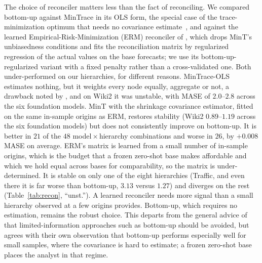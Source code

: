 \documentclass[review,number]{elsarticle}
\begin{document}
The choice of reconciler matters less than the fact of reconciling. We compared
bottom-up against MinTrace in its OLS form, the special case of the trace-minimization
optimum that needs no covariance estimate~\citep{mint2019}, and against the learned
Empirical-Risk-Minimization (ERM) reconciler of \citet{bentaieb2019erm}, which drops
MinT's unbiasedness conditions and fits the reconciliation matrix by regularized
regression of the actual values on the base forecasts; we use its
bottom-up-regularized variant with a fixed penalty rather than a cross-validated one.
Both under-performed on our hierarchies, for different reasons. MinTrace-OLS estimates
nothing, but it weights every node equally, aggregate or not, a drawback noted by
\citet{hfreview2024}, and on Wiki2 it was unstable, with MASE of $2.0$--$2.8$ across the
six foundation models. MinT
with the shrinkage covariance estimator,
fitted on the same in-sample origins as ERM, restores stability (Wiki2 $0.89$--$1.19$
across the six foundation models) but does not consistently improve on bottom-up. It is
better in $21$ of the $48$ model\,$\times$\,hierarchy combinations and worse in $26$, by
$+0.008$ MASE on average. ERM's matrix is learned from a small number of in-sample
origins, which is the budget that a frozen zero-shot base makes affordable and which we
hold equal across bases for comparability, so the matrix is under-determined. It is
stable on only one
of the eight hierarchies
(Traffic, and even there it is far worse than bottom-up, $3.13$ versus $1.27$) and
diverges on the rest (Table~\ref{tab:recon}, ``unst.''). A learned reconciler needs more
signal than a small hierarchy observed at a few origins provides. Bottom-up, which
requires no estimation, remains the robust choice. This departs from the general advice
of \citet{mint2019} that limited-information approaches such as bottom-up should be
avoided, but agrees with their own observation that bottom-up performs especially well
for small samples, where the covariance is hard to estimate; a frozen zero-shot base
places the analyst in that regime.
\end{document}
